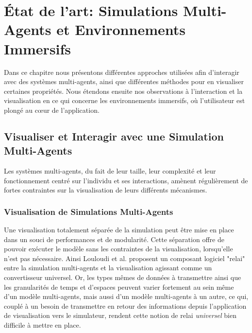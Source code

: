 \chapter{État de l'art: Simulations Multi-Agents et Environnements Immersifs}
\label{ChapitreEAVR}

	Dans ce chapitre nous présentons différentes approches utilisées afin d'interagir avec des systèmes multi-agents, ainsi que différentes méthodes pour en visualiser certaines propriétés. Nous étendons ensuite nos observations à l'interaction et la visualisation en ce qui concerne les environnements immersifs, où l'utilisateur est plongé au cœur de l'application.
	

	\section{Visualiser et Interagir avec une Simulation Multi-Agents}
		
	Les systèmes multi-agents, du fait de leur taille, leur complexité et leur fonctionnement centré sur l'individu et ses interactions, amènent régulièrement de fortes contraintes sur la visualisation de leurs différents mécanismes.		
		
		\subsection{Visualisation de Simulations Multi-Agents}
		
		Une visualisation totalement séparée de la simulation peut être mise en place dans un souci de performances et de modularité. Cette séparation offre de pouvoir exécuter le modèle sans les contraintes de la visualisation, lorsqu'elle n'est pas nécessaire. Ainsi Louloudi et al. \cite{louloudi_new_2012} proposent un composant logiciel "relai" entre la simulation multi-agents et la visualisation agissant comme un convertisseur universel.
		Or, les types mêmes de données à transmettre ainsi que les granularités de temps et d'espaces peuvent varier fortement au sein même d'un modèle multi-agents, mais aussi d'un modèle multi-agents à un autre, ce qui, couplé à un besoin de transmettre en retour des informations depuis l'application de visualisation vers le simulateur, rendent cette notion de relai \textit{universel} bien difficile à mettre en place.
		
